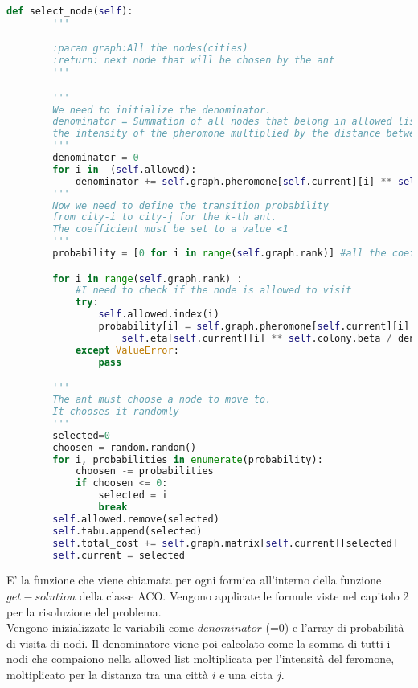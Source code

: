 \documentclass[a4paper,12pt]{report}
\begin{document}
\begin{lstlisting}[language=Python]
    def select_node(self):
        '''

        :param graph:All the nodes(cities)
        :return: next node that will be chosen by the ant
        '''

        '''
        We need to initialize the denominator.
        denominator = Summation of all nodes that belong in allowed list multiplied by 
        the intensity of the pheromone multiplied by the distance between city-i and city-j
        '''
        denominator = 0
        for i in  (self.allowed):
            denominator += self.graph.pheromone[self.current][i] ** self.colony.alpha * self.eta[self.current][i]**self.colony.beta
        '''
        Now we need to define the transition probability 
        from city-i to city-j for the k-th ant.
        The coefficient must be set to a value <1
        '''
        probability = [0 for i in range(self.graph.rank)] #all the coefficients are equals to 0 for every node

        for i in range(self.graph.rank) :
            #I need to check if the node is allowed to visit
            try:
                self.allowed.index(i)
                probability[i] = self.graph.pheromone[self.current][i] ** self.colony.alpha * \
                    self.eta[self.current][i] ** self.colony.beta / denominator
            except ValueError:
                pass

        '''
        The ant must choose a node to move to.
        It chooses it randomly
        '''
        selected=0
        choosen = random.random()
        for i, probabilities in enumerate(probability):
            choosen -= probabilities
            if choosen <= 0:
                selected = i
                break
        self.allowed.remove(selected)
        self.tabu.append(selected)
        self.total_cost += self.graph.matrix[self.current][selected]
        self.current = selected  
\end{lstlisting}
E' la funzione che viene chiamata per ogni formica all'interno della funzione $get-solution$ della classe ACO. Vengono applicate le formule viste nel capitolo 2 per la risoluzione del problema.\\
Vengono inizializzate le variabili come $denominator$ (=0) e l'array di probabilità di visita di nodi.
Il denominatore viene poi calcolato come la somma di tutti i nodi che compaiono nella allowed list moltiplicata per l'intensità del feromone, moltiplicato per la distanza tra una città $i$ e una citta $j$.\\
\end{document}
